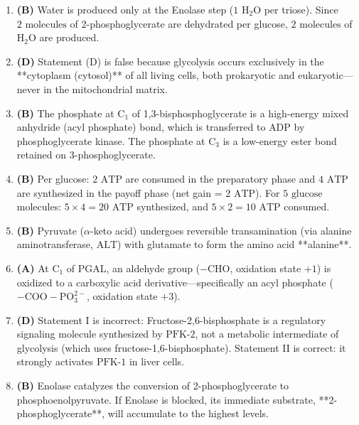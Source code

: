 \documentclass[11pt, a4paper]{article}
\begin{document}
\begin{enumerate}[label=\textbf{\arabic*.}]
\item \textbf{(B)} Water is produced only at the Enolase step ($1\text{ H}_2\text{O}$ per triose). Since $2\text{ molecules}$ of 2-phosphoglycerate are dehydrated per glucose, $2\text{ molecules}$ of $\text{H}_2\text{O}$ are produced.

\item \textbf{(D)} Statement (D) is false because glycolysis occurs exclusively in the **cytoplasm (cytosol)** of all living cells, both prokaryotic and eukaryotic—never in the mitochondrial matrix.

\item \textbf{(B)} The phosphate at $\text{C}_1$ of 1,3-bisphosphoglycerate is a high-energy mixed anhydride (acyl phosphate) bond, which is transferred to $\text{ADP}$ by phosphoglycerate kinase. The phosphate at $\text{C}_3$ is a low-energy ester bond retained on 3-phosphoglycerate.

\item \textbf{(B)} Per glucose: $2\text{ ATP}$ are consumed in the preparatory phase and $4\text{ ATP}$ are synthesized in the payoff phase (net gain = $2\text{ ATP}$). For $5\text{ glucose}$ molecules: $5 \times 4 = 20\text{ ATP}$ synthesized, and $5 \times 2 = 10\text{ ATP}$ consumed.

\item \textbf{(B)} Pyruvate ($\alpha$-keto acid) undergoes reversible transamination (via alanine aminotransferase, $\text{ALT}$) with glutamate to form the amino acid **alanine**.

\item \textbf{(A)} At $\text{C}_1$ of $\text{PGAL}$, an aldehyde group ($-\text{CHO}$, oxidation state $+1$) is oxidized to a carboxylic acid derivative—specifically an acyl phosphate ($-\text{COO}-\text{PO}_3^{2-}$, oxidation state $+3$).

\item \textbf{(D)} Statement I is incorrect: Fructose-2,6-bisphosphate is a regulatory signaling molecule synthesized by $\text{PFK-2}$, not a metabolic intermediate of glycolysis (which uses fructose-1,6-bisphosphate). Statement II is correct: it strongly activates $\text{PFK-1}$ in liver cells.

\item \textbf{(B)} Enolase catalyzes the conversion of 2-phosphoglycerate to phosphoenolpyruvate. If Enolase is blocked, its immediate substrate, **2-phosphoglycerate**, will accumulate to the highest levels.

\end{enumerate}
\end{document}
